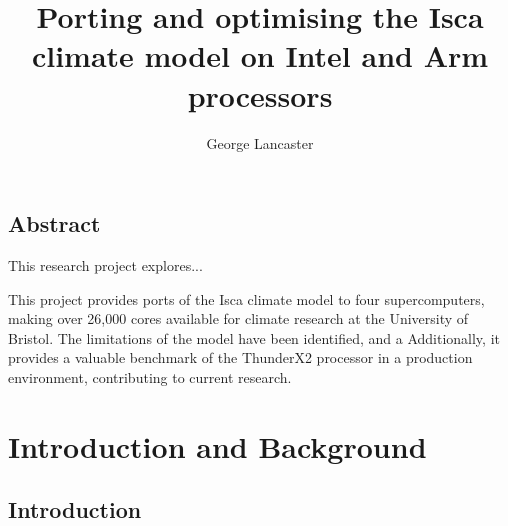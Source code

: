 \documentclass[a4paper,11pt]{report}
\title{Porting and optimising the Isca climate model on Intel and Arm processors}
\author{George Lancaster}
\begin{document}

\tableofcontents{}
\listoffigures
\listoftables
\printglossary[type=\acronymtype,title=List of Abbreviations]

\chapter*{Abstract}
   This research project explores...
   \par
This project provides ports of the Isca climate model to four supercomputers, making over 26,000 cores available for climate research at the University of Bristol. The limitations of the model have been identified, and a  Additionally, it provides a valuable benchmark of the ThunderX2 processor in a production environment, contributing to current research.


\cleardoublepage%

\part{Introduction and Background}
\chapter{Introduction}
\label{chap:intro}
\end{document}
